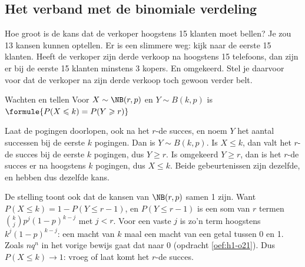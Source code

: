 
\begin{oefeningen}
\end{oefeningen}

\subsection{Het verband met de binomiale verdeling}

Hoe groot is de kans dat de verkoper hoogstens 15 klanten moet bellen? Je zou 13 kansen kunnen optellen. Er is een slimmere weg: kijk naar de eerste 15 klanten. Heeft de verkoper zijn derde verkoop na hoogstens 15 telefoons, dan zijn er bij de eerste 15 klanten minstens 3 kopers. En omgekeerd. Stel je daarvoor voor dat de verkoper na zijn derde verkoop toch gewoon verder belt.

\begin{theorie}
\begin{stelling}{Wachten en tellen}
Voor $X \sim \NB(r, p)$ en $Y \sim B(k, p)$ is \quad $\formule{P(X \leqslant k) = P(Y \geqslant r)}$
\end{stelling}

\begin{bewijs}
Laat de pogingen doorlopen, ook na het $r$-de succes, en noem $Y$ het aantal successen bij de eerste $k$ pogingen. Dan is $Y \sim B(k, p)$. Is $X \leqslant k$, dan valt het $r$-de succes bij de eerste $k$ pogingen, dus $Y \geqslant r$. Is omgekeerd $Y \geqslant r$, dan is het $r$-de succes er na hoogstens $k$ pogingen, dus $X \leqslant k$. Beide gebeurtenissen zijn dezelfde, en hebben dus dezelfde kans.
\end{bewijs}
\end{theorie}

De stelling toont ook dat de kansen van $\NB(r, p)$ samen 1 zijn. Want $P(X \leqslant k) = 1 - P(Y \leqslant r - 1)$, en $P(Y \leqslant r - 1)$ is een som van $r$ termen $\binom{k}{j}p^j(1 - p)^{k-j}$ met $j < r$. Voor een vaste $j$ is zo'n term hoogstens $k^j (1 - p)^{k-j}$: een macht van $k$ maal een macht van een getal tussen 0 en 1. Zoals $nq^n$ in het vorige bewijs gaat dat naar 0 (opdracht \ref{oef:h1-o21}). Dus $P(X \leqslant k) \to 1$: vroeg of laat komt het $r$-de succes.

